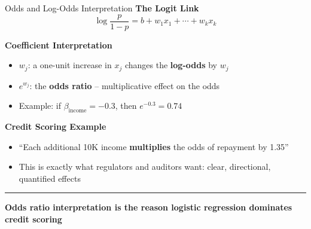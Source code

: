 \documentclass[8pt,aspectratio=169]{beamer}
\newcommand{\bottomnote}[1]{%
\vfill
\vspace{-2mm}
\textcolor{mllavender2}{\rule{\textwidth}{0.4pt}}
\vspace{1mm}
\footnotesize
\textbf{#1}
}
\begin{document}
\begin{frame}[t]{Odds and Log-Odds Interpretation}
\textbf{The Logit Link}
\begin{equation}
\log\frac{p}{1-p} = b + w_1 x_1 + \cdots + w_k x_k
\end{equation}

\vspace{0.3em}
\textbf{Coefficient Interpretation}
\begin{itemize}
  \item $w_j$: a one-unit increase in $x_j$ changes the \textbf{log-odds} by $w_j$
  \item $e^{w_j}$: the \textbf{odds ratio} -- multiplicative effect on the odds
  \item Example: if $\beta_{\text{income}} = -0.3$, then $e^{-0.3} = 0.74$
\end{itemize}

\vspace{0.3em}
\textbf{Credit Scoring Example}
\begin{itemize}
  \item ``Each additional 10K income \textbf{multiplies} the odds of repayment by 1.35''
  \item This is exactly what regulators and auditors want: clear, directional, quantified effects
\end{itemize}
\bottomnote{Odds ratio interpretation is the reason logistic regression dominates credit scoring}
\end{frame}
\end{document}
